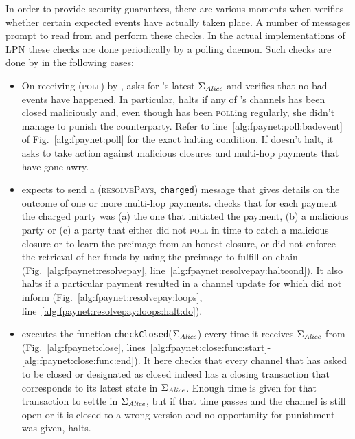   In order to provide security guarantees, there are various moments when
  \fpaynet{} verifies whether certain expected events have actually taken place.
  A number of messages prompt \fpaynet{} to read from \ledger{} and perform
  these checks. In the actual implementations of LPN these checks are done
  periodically by a polling daemon. Such checks are done by \fpaynet{} in the
  following cases:
  \begin{itemize}
    \item On receiving (\textsc{poll}) by \alice, \fpaynet{} asks \ledger{} for
    \alice's latest $\Sigma_{\mathit{Alice}}$ and verifies that no bad events have
    happened. In particular, \fpaynet{} halts if any of \alice's channels has
    been closed maliciously and, even though \alice{} has been \textsc{poll}ing
    regularly, she didn't manage to punish the counterparty. Refer to
    line~\ref{alg:fpaynet:poll:badevent} of Fig.~\ref{alg:fpaynet:poll} for the
    exact halting condition. If \fpaynet{} doesn't halt, it asks \simulator{} to
    take action against malicious closures and multi-hop payments that have gone
    awry.
    \item \fpaynet{} expects \simulator{} to send a (\textsc{resolvePays},
    \texttt{charged}) message that gives details on the outcome of one or more
    multi-hop payments. \fpaynet{} checks that for each payment the charged
    party was (a) the one that initiated the payment, (b) a malicious party or
    (c) a party that either did not \textsc{poll} in time to catch a malicious
    closure or to learn the preimage from an honest closure, or did not enforce
    the retrieval of her funds by using the preimage to fulfill on chain
    (Fig.~\ref{alg:fpaynet:resolvepay},
    line~\ref{alg:fpaynet:resolvepay:haltcond}). It also halts if a particular
    payment resulted in a channel update for which \simulator{} did not inform
    \fpaynet{} (Fig.~\ref{alg:fpaynet:resolvepay:loops},
    line~\ref{alg:fpaynet:resolvepay:loops:halt:do}).
    \item \fpaynet{} executes the function
    \texttt{checkClosed}($\Sigma_{\mathit{Alice}}$) every time it receives
    $\Sigma_{\mathit{Alice}}$ from \ledger{} (Fig.~\ref{alg:fpaynet:close},
    lines~\ref{alg:fpaynet:close:func:start}-\ref{alg:fpaynet:close:func:end}).
    It here checks that every channel that \environment{} has asked to be closed
    or \simulator{} designated as closed indeed has a closing transaction that
    corresponds to its latest state in $\Sigma_{\mathit{Alice}}$. Enough time is given
    for that transaction to settle in $\Sigma_{\mathit{Alice}}$, but if that time passes
    and the channel is still open or it is closed to a wrong version and no
    opportunity for punishment was given, \fpaynet{} halts.
  \end{itemize}

